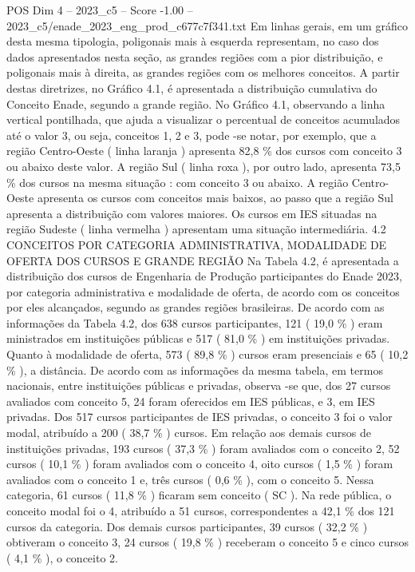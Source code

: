 \begin{textsample}{POS Dim 4 – 2023\_c5 – Score -1.00 – 2023\_c5/enade\_2023\_eng\_prod\_c677c7f341.txt}
Em linhas gerais, em um gráfico desta mesma tipologia, poligonais mais à esquerda representam, no caso dos dados apresentados nesta seção, as grandes regiões com a pior distribuição, e poligonais mais à direita, as grandes regiões com os melhores conceitos.
A partir destas diretrizes, no Gráfico 4.1, é apresentada a distribuição cumulativa do Conceito Enade, segundo a grande região.
No Gráfico 4.1, observando a linha vertical pontilhada, que ajuda a visualizar o percentual de conceitos acumulados até o valor 3, ou seja, conceitos 1, 2 e 3, pode -se notar, por exemplo, que a região Centro-Oeste ( linha laranja ) apresenta 82,8 \% dos cursos com conceito 3 ou abaixo deste valor.
A região Sul ( linha roxa ), por outro lado, apresenta 73,5 \% dos cursos na mesma situação : com conceito 3 ou abaixo.
A região Centro-Oeste apresenta os cursos com conceitos mais baixos, ao passo que a região Sul apresenta a distribuição com valores maiores.
Os cursos em IES situadas na região Sudeste ( linha vermelha ) apresentam uma situação intermediária. 4.2 CONCEITOS POR CATEGORIA ADMINISTRATIVA, MODALIDADE DE OFERTA DOS CURSOS E GRANDE REGIÃO Na Tabela 4.2, é apresentada a distribuição dos cursos de Engenharia de Produção participantes do Enade 2023, por categoria administrativa e modalidade de oferta, de acordo com os conceitos por eles alcançados, segundo as grandes regiões brasileiras.
De acordo com as informações da Tabela 4.2, dos 638 cursos participantes, 121 ( 19,0 \% ) eram ministrados em instituições públicas e 517 ( 81,0 \% ) em instituições privadas.
Quanto à modalidade de oferta, 573 ( 89,8 \% ) cursos eram presenciais e 65 ( 10,2 \% ), a distância.
De acordo com as informações da mesma tabela, em termos nacionais, entre instituições públicas e privadas, observa -se que, dos 27 cursos avaliados com conceito 5, 24 foram oferecidos em IES públicas, e 3, em IES privadas.
Dos 517 cursos participantes de IES privadas, o conceito 3 foi o valor modal, atribuído a 200 ( 38,7 \% ) cursos.
Em relação aos demais cursos de instituições privadas, 193 cursos ( 37,3 \% ) foram avaliados com o conceito 2, 52 cursos ( 10,1 \% ) foram avaliados com o conceito 4, oito cursos ( 1,5 \% ) foram avaliados com o conceito 1 e, três cursos ( 0,6 \% ), com o conceito 5.
Nessa categoria, 61 cursos ( 11,8 \% ) ficaram sem conceito ( SC ).
Na rede pública, o conceito modal foi o 4, atribuído a 51 cursos, correspondentes a 42,1 \% dos 121 cursos da categoria.
Dos demais cursos participantes, 39 cursos ( 32,2 \% ) obtiveram o conceito 3, 24 cursos ( 19,8 \% ) receberam o conceito 5 e cinco cursos ( 4,1 \% ), o conceito 2.

\end{textsample}
